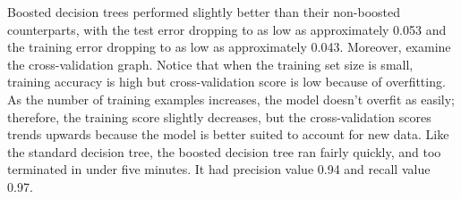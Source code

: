 \documentclass[11pt, a4paper]{article} %
\begin{document}
\newline\newline
Boosted decision trees performed slightly better than their non-boosted counterparts, with the test error dropping to as low as approximately 0.053 and the training error dropping to as low as approximately 0.043. Moreover, examine the cross-validation graph. Notice that when the training set size is small, training accuracy is high but cross-validation score is low because of overfitting. As the number of training examples increases, the model doesn't overfit as easily; therefore, the training score slightly decreases, but the cross-validation scores trends upwards because the model is better suited to account for new data. Like the standard decision tree, the boosted decision tree ran fairly quickly, and too terminated in under five minutes. It had precision value 0.94 and recall value 0.97.
\end{document}
